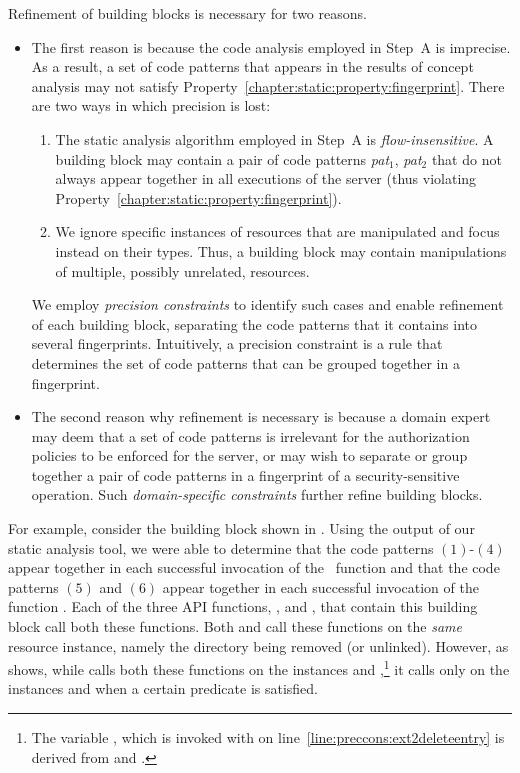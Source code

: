 Refinement of building blocks is necessary for two reasons. 

\begin{itemize}
%
\item The first reason is because the code analysis employed in Step~A is
imprecise. As a result, a set of code patterns that appears in the results of
concept analysis may not satisfy
Property~\ref{chapter:static:property:fingerprint}.  There are two ways in
which precision is lost:
%
\begin{enumerate}
%
\item The static analysis algorithm employed in Step~A is
\textit{flow-insensitive}. A building block may contain a pair of code patterns
\textit{pat$_1$}, \textit{pat$_2$} that do not always appear together in all
executions of the server (thus violating
Property~\ref{chapter:static:property:fingerprint}).
%
\item We ignore specific instances of resources that are manipulated and focus
instead on their types. Thus, a building block may contain manipulations of
multiple, possibly unrelated, resources.  
%
\end{enumerate}
%
We employ \textit{precision constraints} to identify such cases and enable
refinement of each building block, separating the code patterns that it
contains into several fingerprints.  Intuitively, a precision constraint is a
rule that determines the set of code patterns that can be grouped together in a
fingerprint. 
%
\item The second reason why refinement is necessary is because a domain expert
may deem that a set of code patterns is irrelevant for the authorization
policies to be enforced for the server, or may wish to separate or group
together a pair of code patterns in a fingerprint of a security-sensitive
operation. Such \textit{domain-specific constraints} further refine building
blocks.
%
\end{itemize}

For example, consider the building block shown in
. Using the output of our static analysis tool, we
were able to determine that the code patterns $(1)$-$(4)$ appear together in
each successful invocation of the \ext\ function  and
that the code patterns $(5)$ and $(6)$ appear together in each successful
invocation of the function . Each of the three API
functions, ,  and ,
that contain this building block call both these functions. Both
 and  call these functions on the
\textit{same} resource instance, namely the directory being removed (or
unlinked). However, as  shows, while
 calls both these functions on the instances 
and ,\footnote{The variable , which
 is invoked with on
line~\ref{line:preccons:ext2deleteentry} is derived from  and
.} it calls  only on the instances
 and  when a certain predicate
 is satisfied. 

